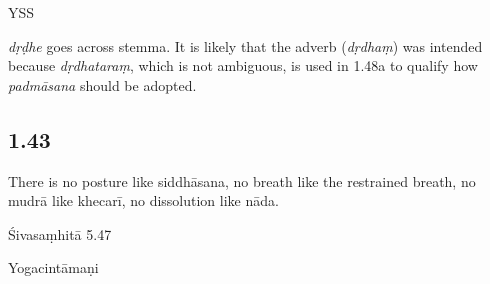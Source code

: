 \begin{ekdosis}
\begin{testimonia}[hp01_042]
\begin{versinnote}
\end{versinnote}

YSS

\begin{versinnote}
\end{versinnote}

\end{testimonia}

\begin{philcomm}[hp01_042]
\emph{dṛḍhe} goes across stemma. It is likely that the adverb (\emph{dṛdhaṃ}) was intended because \emph{dṛdhataraṃ}, which is not ambiguous, is used in 1.48a to qualify how \emph{padmāsana} should be adopted.
\end{philcomm}

\subsection*{1.43}
\begin{translation}[hp01_043]
There is no posture like siddhāsana, no breath like the restrained breath, no mudrā like khecarī, no dissolution like nāda.
\end{translation}

\begin{sources}[hp01_043]
Śivasaṃhitā 5.47

\begin{versinnote}
\end{versinnote}

\end{sources}

\begin{testimonia}[hp01_043]
Yogacintāmaṇi

\begin{versinnote}
\end{versinnote}


\end{testimonia}
\end{ekdosis}
